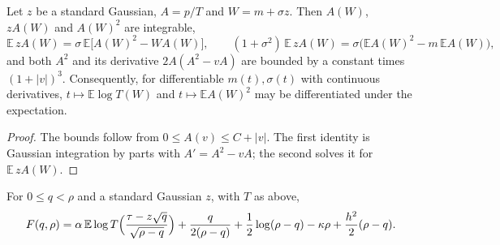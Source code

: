 \begin{lemma}\label{lem:sg-tal:st-mills-affine}
  \leanok
Let $z$ be a standard Gaussian, $A=p/T$ and $W=m+\sigma z$. Then $A(W)$, $zA(W)$ and $A(W)^2$ are integrable,
\[
\mathbb E\,zA(W)=\sigma\,\mathbb E\bigl[A(W)^2-WA(W)\bigr],\qquad
(1+\sigma^2)\,\mathbb E\,zA(W)=\sigma\bigl(\mathbb E A(W)^2-m\,\mathbb E A(W)\bigr),
\]
and both $A^2$ and its derivative $2A(A^2-vA)$ are bounded by a constant times $(1+|v|)^3$. Consequently, for
differentiable $m(t),\sigma(t)$ with continuous derivatives, $t\mapsto\mathbb E\log T(W)$ and
$t\mapsto\mathbb E A(W)^2$ may be differentiated under the expectation.
\end{lemma}
\begin{proof}
  \leanok
The bounds follow from $0\le A(v)\le C+|v|$. The first identity is Gaussian integration by parts with
$A'=A^2-vA$; the second solves it for $\mathbb E\,zA(W)$.
\end{proof}

\begin{definition}\label{def:sg-tal:st-hard-functional}
  \leanok
{}
For $0\le q<\rho$ and a standard Gaussian $z$, with $T$ as above,
\[
F(q,\rho)=\alpha\,\mathbb E\log T\Bigl(\frac{\tau-z\sqrt q}{\sqrt{\rho-q}}\Bigr)+\frac{q}{2(\rho-q)}
+\frac12\log(\rho-q)-\kappa\rho+\frac{h^2}{2}(\rho-q).
\]
\end{definition}

